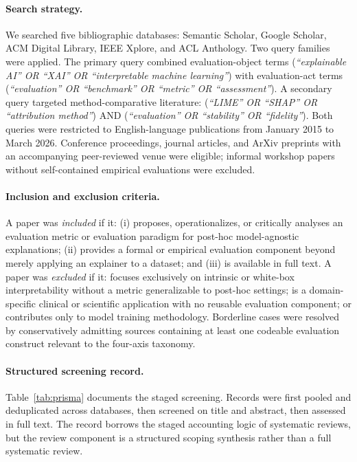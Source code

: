 \documentclass[10pt,a4paper,twoside]{article}
\begin{document}
\paragraph{Search strategy.}
We searched five bibliographic databases: Semantic Scholar, Google
Scholar, ACM Digital Library, IEEE Xplore, and ACL Anthology. Two
query families were applied. The primary query combined evaluation-object
terms (\emph{``explainable AI'' OR ``XAI'' OR ``interpretable machine
learning''}) with evaluation-act terms (\emph{``evaluation'' OR
``benchmark'' OR ``metric'' OR ``assessment''}). A secondary query
targeted method-comparative literature: (\emph{``LIME'' OR ``SHAP'' OR
``attribution method''}) AND (\emph{``evaluation'' OR ``stability'' OR
``fidelity''}). Both queries were restricted to English-language
publications from January 2015 to March 2026. Conference proceedings,
journal articles, and ArXiv preprints with an accompanying peer-reviewed
venue were eligible; informal workshop papers without self-contained
empirical evaluations were excluded.

\paragraph{Inclusion and exclusion criteria.}
A paper was \emph{included} if it: (i) proposes, operationalizes, or
critically analyses an evaluation metric or evaluation paradigm for
post-hoc model-agnostic explanations; (ii) provides a formal or
empirical evaluation component beyond merely applying an explainer to a
dataset; and (iii) is available in full text. A paper was \emph{excluded}
if it: focuses exclusively on intrinsic or white-box interpretability
without a metric generalizable to post-hoc settings; is a
domain-specific clinical or scientific application with no reusable
evaluation component; or contributes only to model training methodology.
Borderline cases were resolved by conservatively admitting sources
containing at least one codeable evaluation construct relevant to the
four-axis taxonomy.

\paragraph{Structured screening record.}
Table~\ref{tab:prisma} documents the staged screening. Records were
first pooled and deduplicated across databases, then screened on title
and abstract, then assessed in full text. The record borrows the staged
accounting logic of systematic reviews, but the review component is a
structured scoping synthesis rather than a full systematic review.
\end{document}

